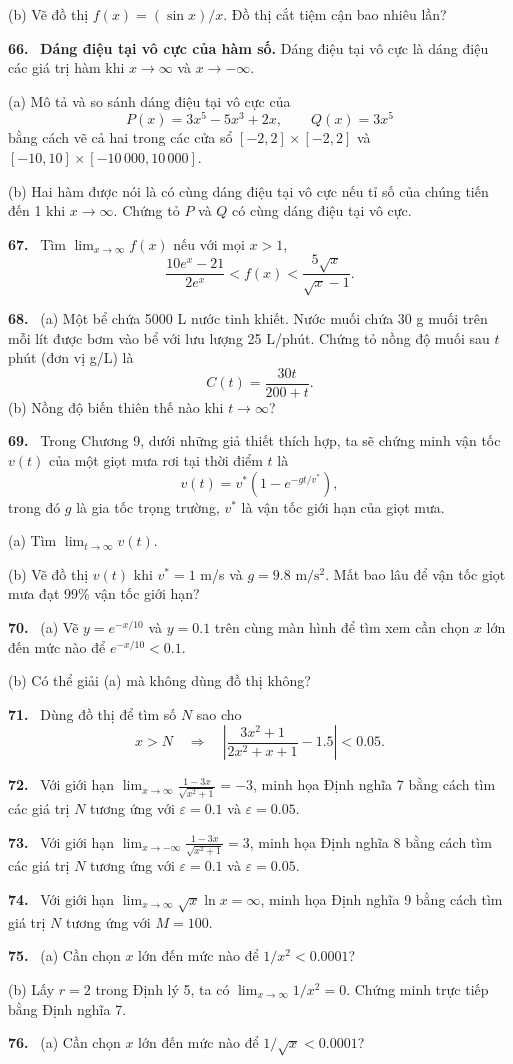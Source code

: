 \documentclass[12pt,a4paper]{article}
\newcommand{\bt}[1]{\par\smallskip\noindent\textbf{#1.}\ }
\begin{document}
(b) Vẽ đồ thị $f(x)=(\sin x)/x$. Đồ thị cắt tiệm cận bao nhiêu lần?
\bt{66} \textbf{Dáng điệu tại vô cực của hàm số.} Dáng điệu tại vô cực là dáng điệu các giá trị hàm khi $x\to\infty$ và $x\to-\infty$.

(a) Mô tả và so sánh dáng điệu tại vô cực của
\[P(x)=3x^5-5x^3+2x,\qquad Q(x)=3x^5\]
bằng cách vẽ cả hai trong các cửa sổ $[-2,2]\times[-2,2]$ và $[-10,10]\times[-10\,000,10\,000]$.

(b) Hai hàm được nói là có cùng dáng điệu tại vô cực nếu tỉ số của chúng tiến đến 1 khi $x\to\infty$. Chứng tỏ $P$ và $Q$ có cùng dáng điệu tại vô cực.
\bt{67} Tìm $\lim_{x\to\infty}f(x)$ nếu với mọi $x>1$,
\[\frac{10e^x-21}{2e^x}<f(x)<\frac{5\sqrt x}{\sqrt x-1}.\]
\bt{68} (a) Một bể chứa 5000 L nước tinh khiết. Nước muối chứa 30 g muối trên mỗi lít được bơm vào bể với lưu lượng 25 L/phút. Chứng tỏ nồng độ muối sau $t$ phút (đơn vị g/L) là
\[C(t)=\frac{30t}{200+t}.\]
(b) Nồng độ biến thiên thế nào khi $t\to\infty$?
\bt{69} Trong Chương 9, dưới những giả thiết thích hợp, ta sẽ chứng minh vận tốc $v(t)$ của một giọt mưa rơi tại thời điểm $t$ là
\[v(t)=v^*(1-e^{-gt/v^*}),\]
trong đó $g$ là gia tốc trọng trường, $v^*$ là vận tốc giới hạn của giọt mưa.

(a) Tìm $\lim_{t\to\infty}v(t)$.

(b) Vẽ đồ thị $v(t)$ khi $v^*=1$ m/s và $g=9.8$ $\mathrm{m/s^2}$. Mất bao lâu để vận tốc giọt mưa đạt 99\% vận tốc giới hạn?
\bt{70} (a) Vẽ $y=e^{-x/10}$ và $y=0.1$ trên cùng màn hình để tìm xem cần chọn $x$ lớn đến mức nào để $e^{-x/10}<0.1$.

(b) Có thể giải (a) mà không dùng đồ thị không?
\bt{71} Dùng đồ thị để tìm số $N$ sao cho
\[x>N\quad\Longrightarrow\quad\left|\frac{3x^2+1}{2x^2+x+1}-1.5\right|<0.05.\]
\bt{72} Với giới hạn $\displaystyle\lim_{x\to\infty}\frac{1-3x}{\sqrt{x^2+1}}=-3$, minh họa Định nghĩa 7 bằng cách tìm các giá trị $N$ tương ứng với $\varepsilon=0.1$ và $\varepsilon=0.05$.
\bt{73} Với giới hạn $\displaystyle\lim_{x\to-\infty}\frac{1-3x}{\sqrt{x^2+1}}=3$, minh họa Định nghĩa 8 bằng cách tìm các giá trị $N$ tương ứng với $\varepsilon=0.1$ và $\varepsilon=0.05$.
\bt{74} Với giới hạn $\displaystyle\lim_{x\to\infty}\sqrt{x}\ln x=\infty$, minh họa Định nghĩa 9 bằng cách tìm giá trị $N$ tương ứng với $M=100$.
\bt{75} (a) Cần chọn $x$ lớn đến mức nào để $1/x^2<0.0001$?

(b) Lấy $r=2$ trong Định lý 5, ta có $\lim_{x\to\infty}1/x^2=0$. Chứng minh trực tiếp bằng Định nghĩa 7.
\bt{76} (a) Cần chọn $x$ lớn đến mức nào để $1/\sqrt{x}<0.0001$?
\end{document}
